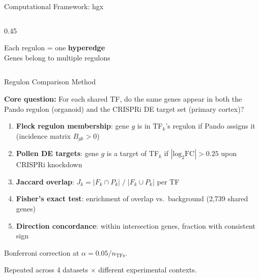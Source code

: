 \documentclass[aspectratio=169,11pt]{beamer}
\begin{document}
\begin{frame}{Computational Framework: hgx}
\begin{columns}[T]
\begin{column}{0.45\textwidth}

\vspace{0.3em}
\centering\scriptsize
Each regulon = one \textbf{hyperedge}\\
Genes belong to multiple regulons
\end{column}
\end{columns}

\end{frame}


\begin{frame}{Regulon Comparison Method}

\textbf{Core question:} For each shared TF, do the same genes appear in both the Pando regulon (organoid) and the CRISPRi DE target set (primary cortex)?

\vspace{0.5em}

\begin{enumerate}
    \item \textbf{Fleck regulon membership}: gene $g$ is in TF$_k$'s regulon if Pando assigns it (incidence matrix $B_{gk} > 0$)
    \item \textbf{Pollen DE targets}: gene $g$ is a target of TF$_k$ if $|\text{log}_2\text{FC}| > 0.25$ upon CRISPRi knockdown
    \item \textbf{Jaccard overlap}: $J_k = |F_k \cap P_k| \;/\; |F_k \cup P_k|$ per TF
    \item \textbf{Fisher's exact test}: enrichment of overlap vs.\ background (2{,}739 shared genes)
    \item \textbf{Direction concordance}: within intersection genes, fraction with consistent sign
\end{enumerate}

\vspace{0.5em}
Bonferroni correction at $\alpha = 0.05 / n_{\text{TFs}}$.

\vspace{0.3em}
Repeated across 4 datasets $\times$ different experimental contexts.

\end{frame}

\end{document}
